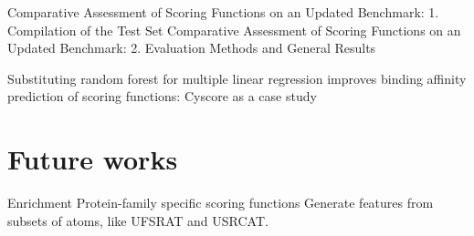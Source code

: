 \citep{1426} Comparative Assessment of Scoring Functions on an Updated Benchmark: 1. Compilation of the Test Set
\citep{1411} Comparative Assessment of Scoring Functions on an Updated Benchmark: 2. Evaluation Methods and General Results

\citep{1432} Substituting random forest for multiple linear regression improves binding affinity prediction of scoring functions: Cyscore as a case study

\section{Future works}

Enrichment
Protein-family specific scoring functions
Generate features from subsets of atoms, like UFSRAT and USRCAT.

\chapterend

